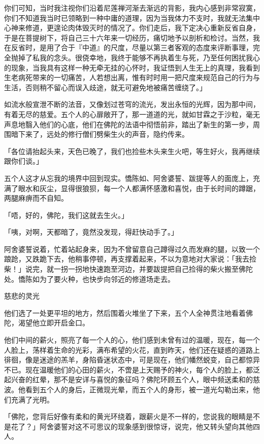 \documentclass[12pt,twoside,openany]{book}
\begin{document}
你们可知，当时我注视你们沿着尼莲禅河渐去渐远的背影，我内心感到非常寂寞，你们不知道我当时已领略到一种中庸的道理，因为当我体力不支时，我就无法集中心神来修道，更遑论肉体毁灭时的情况了。你们走后，我下定决心重新反省自身，于是在菩提树下，将自己三十六年来一切经历，痛切地予以剖析和检讨。当然，我在反省时，是用了合于『中道』的尺度，尽量以第三者客观的态度来评断事理，完全抛掉了私我的念头。很侥幸地，我终于能够不再执着生与死，乃至任何困扰我心的现象，当我具有这样一种无牵无挂的心怀时，我证悟到人生无上的真理，我看到生老病死带来的一切痛苦，人若想出离，惟有时时用一把尺度来规范自己的行为与生活，否则稍不留心而误入歧途，就无可避免地被痛苦缠绕了。」

如流水般宣泄不断的法音，又像划过苍穹的流光，发出永恒的光辉，因为那中间，有着无尽的慈爱。五个人的心扉敞开了，那一道道的光，就如甘霖之于沙粒，毫无声息地翳入他们的心底，他们在佛陀的法语中彻悟前非，踏出了新生的第一步，周围暗下来了，远处的修行僧们劈柴生火的声音，隐约传来。

「各位请抬起头来，天色已晚了，我们也捡些木头来生火吧，等生好火，我再继续跟你们谈。」

五个人这才从忘我的境界中回到现实。憍陈如、阿舍婆誓、跋提等人的面庞上，充满了眼水和灰尘，显得很狼狈，每一个人都满怀感激和喜悦，由于长时间的蹲踞，两腿麻痹而不自知。

「唔，好的，佛陀，我们这就去生火。」

「咦，对啊，天都暗了，竟然没发现，得赶快动手了。」

阿舍婆誓说着，忙着站起身来，因为不曾留意自己蹲得过久而发麻的腿，以致一个踉跄，又跌跪下去，他稍事停顿，再支撑着起来，不以为意地对大家说：「我去捡柴！」说完，就一拐一拐地快速跑至河边，并要跋提把自己捡得的柴火搬至佛陀处。憍陈如为了要火种，也快步向邻近的修道场走去。

慈悲的灵光

他们选了一处更平坦的地方，然后围着火堆坐了下来，五个人全神贯注地看着佛陀，渴望他立即开启金口。

他们中间的薪火，照亮了每一个人的心，他们感到未曾有过的温暖，现在，每一个人脸上，荡样着生命的光彩，满布希望的火花，直到昨天，他们还在疑惑的道路上徘徊，像是迷途的羔羊，身陷昏迷状态中，可是现在，他们幡然蜕变，自己都惊异不已。现在温暖他们的心田的薪火，不啻是上天赐予的神火，每个人的脸上，都泛起兴奋的红晕，那不是安详与喜悦的象征吗？佛陀环顾五个人，眼中频送柔和的慈波。他看到五个人的身后，正微现光晕，而五个人的身形，被一道光勾勒出来，他们充满了光明。

「佛陀，您背后好像有柔和的黄光环绕着，跟薪火是不一样的，您说我的眼睛是不是花了？」阿舍婆誓对这不可思议的现象感到很惊讶，说完，他又转头望向其他四人。
\end{document}
